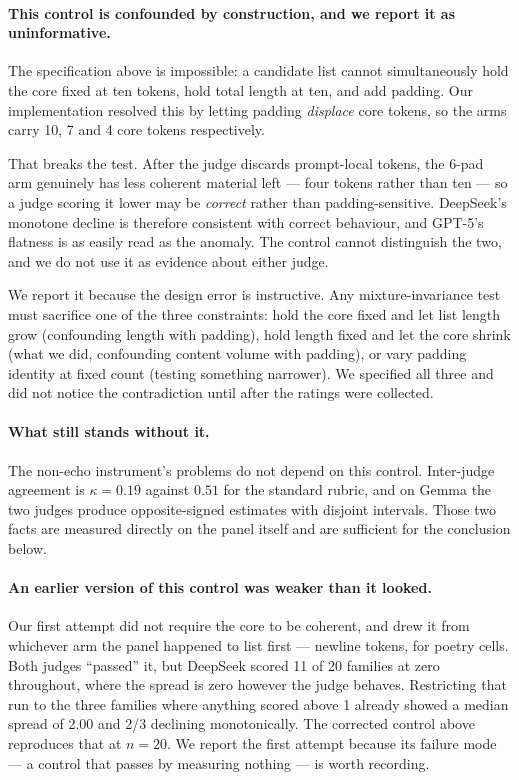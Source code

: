 \documentclass[11pt]{article}
\newcommand{\flag}[1]{\textcolor{flagged}{#1}}
\begin{document}
\paragraph{\flag{This control is confounded by construction, and we report it as
uninformative.}} The specification above is impossible: a candidate list cannot
simultaneously hold the core fixed at ten tokens, hold total length at ten, and
add padding. Our implementation resolved this by letting padding \emph{displace}
core tokens, so the arms carry 10, 7 and 4 core tokens respectively.

That breaks the test. After the judge discards prompt-local tokens, the 6-pad arm
genuinely has less coherent material left --- four tokens rather than ten --- so
a judge scoring it lower may be \emph{correct} rather than padding-sensitive.
\flag{DeepSeek's monotone decline is therefore consistent with correct behaviour,
and GPT-5's flatness is as easily read as the anomaly.} The control cannot
distinguish the two, and we do not use it as evidence about either judge.

We report it because the design error is instructive. Any mixture-invariance test
must sacrifice one of the three constraints: hold the core fixed and let list
length grow (confounding length with padding), hold length fixed and let the core
shrink (what we did, confounding content volume with padding), or vary padding
identity at fixed count (testing something narrower). We specified all three and
did not notice the contradiction until after the ratings were collected.

\paragraph{What still stands without it.} The non-echo instrument's problems do
not depend on this control. Inter-judge agreement is $\kappa = 0.19$ against
$0.51$ for the standard rubric, and on Gemma the two judges produce
opposite-signed estimates with disjoint intervals. Those two facts are measured
directly on the panel itself and are sufficient for the conclusion below.

\paragraph{An earlier version of this control was weaker than it looked.} Our
first attempt did not require the core to be coherent, and drew it from whichever
arm the panel happened to list first --- newline tokens, for poetry cells. Both
judges ``passed'' it, but DeepSeek scored 11 of 20 families at zero throughout,
where the spread is zero however the judge behaves. Restricting that run to the
three families where anything scored above 1 already showed a median spread of
2.00 and 2/3 declining monotonically. The corrected control above reproduces that
at $n = 20$. We report the first attempt because its failure mode --- a control
that passes by measuring nothing --- is worth recording.
\end{document}
